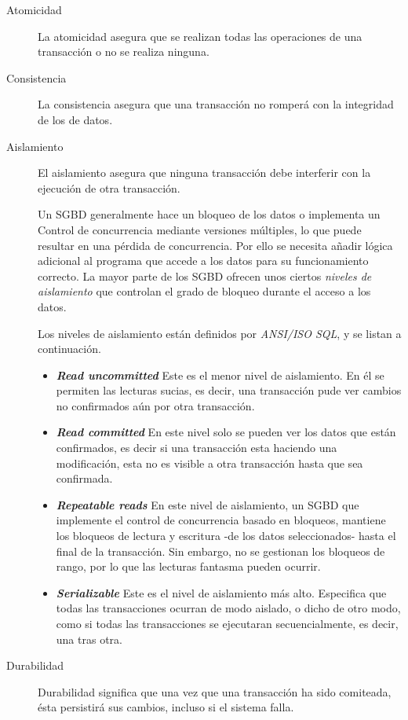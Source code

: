 	\begin{description}
	\item[Atomicidad]
		La atomicidad asegura que se realizan todas las operaciones de una transacción
		o no se realiza ninguna.
		
	\item[Consistencia]
		 La consistencia asegura que una transacción no romperá con la integridad de
		 los de datos.
	  
	\item[Aislamiento]	
		El aislamiento asegura que ninguna transacción debe interferir con la
		ejecución de otra transacción.
		
		Un SGBD generalmente hace un bloqueo de los datos o implementa un Control de
		concurrencia mediante versiones múltiples, lo que puede resultar en una
		pérdida de concurrencia. Por ello se necesita añadir lógica adicional al
		programa que accede a los datos para su funcionamiento correcto.
		La mayor parte de los SGBD ofrecen unos ciertos \emph{niveles de aislamiento}
		que controlan el grado de bloqueo durante el acceso a los datos.
		
		Los niveles de aislamiento están definidos por \emph{ANSI/ISO SQL}, y se listan
		a continuación.
		
		\begin {itemize}
		
			\item{\bf \emph{Read uncommitted}}
				Este es el menor nivel de aislamiento. En él se permiten las lecturas
				sucias, es decir, una transacción pude ver cambios no confirmados
				aún por otra transacción.
			
			\item {\bf \emph{Read committed}}
				En este nivel solo se pueden ver los datos que están confirmados, es decir si
				una  transacción esta haciendo una modificación, esta no es visible a otra
				transacción hasta que sea confirmada.
				
			\item {\bf \emph{Repeatable reads}} 
				En este nivel de aislamiento, un SGBD que implemente el control de
				concurrencia basado en bloqueos, mantiene los bloqueos de lectura y escritura
				-de los datos seleccionados- hasta el final de la transacción. Sin embargo, no
				se gestionan los bloqueos de rango, por lo que las lecturas fantasma pueden
				ocurrir.
			
				
		  \item {\bf \emph{Serializable}}
				Este es el nivel de aislamiento más alto. Especifica que todas las
				transacciones ocurran de modo aislado, o dicho de otro modo, como si todas las
				transacciones se ejecutaran secuencialmente, es decir, una tras otra. 
			
			\end{itemize}
	  	
	\item[Durabilidad]
		
		Durabilidad significa que una vez que una transacción ha sido comiteada, ésta
		persistirá sus cambios, incluso si el sistema falla.
	
	\end{description}
	
